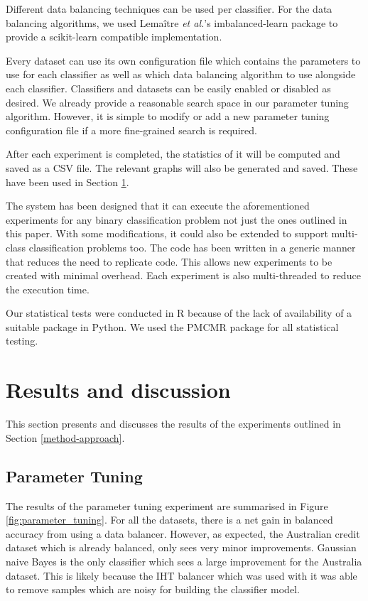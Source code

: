 \documentclass{sig-alternate-05-2015}
\begin{document}
	Different data balancing techniques can be used per classifier. For the data balancing algorithms, we used Lema\^{i}tre \textit{et al.}'s \cite{lemaitre2016imbalanced} imbalanced-learn package to provide a scikit-learn compatible implementation.
	
	Every dataset can use its own configuration file which contains the parameters to use for each classifier as well as which data balancing algorithm to use alongside each classifier. Classifiers and datasets can be easily enabled or disabled as desired. We already provide a reasonable search space in our parameter tuning algorithm. However, it is simple to modify or add a new parameter tuning configuration file if a more fine-grained search is required.
	
	After each experiment is completed, the statistics of it will be computed and saved as a CSV file. The relevant graphs will also be generated and saved. These have been used in Section \ref{results}.
	
	The system has been designed that it can execute the aforementioned experiments for any binary classification problem not just the ones outlined in this paper. With some modifications, it could also be extended to support multi-class classification problems too. The code has been written in a generic manner that reduces the need to replicate code. This allows new experiments to be created with minimal overhead. Each experiment is also multi-threaded to reduce the execution time.
	
	Our statistical tests were conducted in R because of the lack of availability of a suitable package in Python. We used the PMCMR \cite{pmcmr} package for all statistical testing.
	
	\section{Results and discussion}
	\label{results}
	This section presents and discusses the results of the experiments outlined in Section \ref{method-approach}.
	\subsection{Parameter Tuning}
	The results of the parameter tuning experiment are summarised in Figure \ref{fig:parameter_tuning}. For all the datasets, there is a net gain in balanced accuracy from using a data balancer. However, as expected, the Australian credit dataset which is already balanced, only sees very minor improvements. Gaussian naive Bayes is the only classifier which sees a large improvement for the Australia dataset. This is likely because the IHT balancer which was used with it was able to remove samples which are noisy for building the classifier model. 
	
\end{document}
